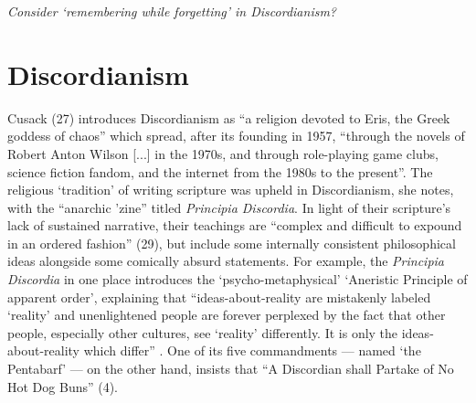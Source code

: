 \documentclass[Draft.tex]{subfiles}
\begin{document}
\textit{Consider `remembering while forgetting' in Discordianism?}

\section*{Discordianism}
Cusack (27) introduces Discordianism as
``a religion devoted to Eris, the Greek goddess of chaos''
which spread, after its founding in 1957, ``through
the novels of Robert Anton Wilson [...] in the 1970s,
and through role-playing game clubs, science fiction fandom,
and the internet from the 1980s to the present''.
The religious `tradition' of writing scripture was upheld in Discordianism,
she notes, with the ``anarchic 'zine'' titled \textit{Principia Discordia}.
In light of their scripture's lack of sustained narrative, their teachings
are ``complex and difficult to expound in an ordered fashion'' (29),
but include some internally consistent philosophical ideas
alongside some comically absurd statements.
For example, the \textit{Principia Discordia} in one place introduces the
`psycho-metaphysical' `Aneristic Principle of apparent order',
explaining that ``ideas-about-reality are mistakenly labeled `reality'
and unenlightened people are forever perplexed by the fact that
other people, especially other cultures, see `reality' differently.
It is only the ideas-about-reality which differ'' \parencite[49]{Principia}.
One of its five commandments --- named `the Pentabarf' ---
on the other hand, insists that
``A Discordian shall Partake of No Hot Dog Buns'' (4).
\end{document}
